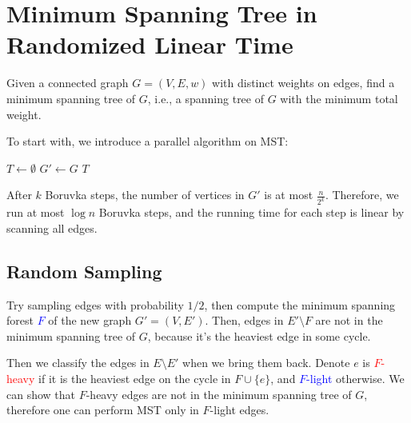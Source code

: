 \chapter{Minimum Spanning Tree in Randomized Linear Time}

\begin{problem}[MST]
Given a connected graph $G = (V, E, w)$ with distinct weights on edges, find a minimum spanning tree of $G$, i.e., a spanning tree of $G$ with the minimum total weight.
\end{problem}

To start with, we introduce a parallel algorithm on MST:

\begin{algorithm}[H]
	\caption{Boruvka's Algorithm}
	$T \gets \emptyset$\;
	$G' \gets G$\;
	\Return $T$\;
\end{algorithm}

After $k$ Boruvka steps, the number of vertices in $G'$ is at most $\frac{n}{2^k}$. Therefore, we run at most $\log n$ Boruvka steps, and the running time for each step is linear by scanning all edges.

\section{Random Sampling}

Try sampling edges with probability $1/2$, then compute the minimum spanning forest \textcolor{blue}{$F$} of the new graph $G' = (V, E')$. Then, edges in $E'\setminus F$ are not in the minimum spanning tree of $G$, because it's the heaviest edge in some cycle.

Then we classify the edges in $E\setminus E'$ when we bring them back. Denote $e$ is \textcolor{red}{$F$-heavy} if it is the heaviest edge on the cycle in $F\cup \{e\}$, and \textcolor{blue}{$F$-light} otherwise. We can show that $F$-heavy edges are not in the minimum spanning tree of $G$, therefore one can perform MST only in $F$-light edges.

